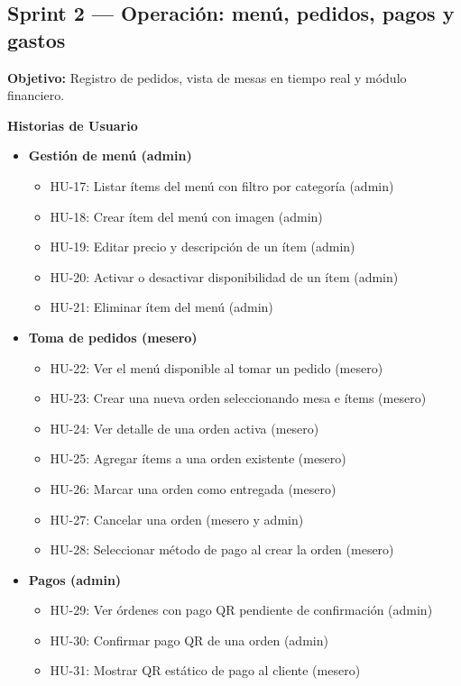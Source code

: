 \subsection*{Sprint 2 — Operación: menú, pedidos, pagos y gastos}

\textbf{Objetivo:}  
Registro de pedidos, vista de mesas en tiempo real y módulo financiero.

\textbf{Historias de Usuario}

\begin{itemize}[leftmargin=1.5em]

\item \textbf{Gestión de menú (admin)}

\begin{itemize}
\item HU-17: Listar ítems del menú con filtro por categoría (admin)
\item HU-18: Crear ítem del menú con imagen (admin)
\item HU-19: Editar precio y descripción de un ítem (admin)
\item HU-20: Activar o desactivar disponibilidad de un ítem (admin)
\item HU-21: Eliminar ítem del menú (admin)
\end{itemize}

\item \textbf{Toma de pedidos (mesero)}

\begin{itemize}
\item HU-22: Ver el menú disponible al tomar un pedido (mesero)
\item HU-23: Crear una nueva orden seleccionando mesa e ítems (mesero)
\item HU-24: Ver detalle de una orden activa (mesero)
\item HU-25: Agregar ítems a una orden existente (mesero)
\item HU-26: Marcar una orden como entregada (mesero)
\item HU-27: Cancelar una orden (mesero y admin)
\item HU-28: Seleccionar método de pago al crear la orden (mesero)
\end{itemize}

\item \textbf{Pagos (admin)}

\begin{itemize}
\item HU-29: Ver órdenes con pago QR pendiente de confirmación (admin)
\item HU-30: Confirmar pago QR de una orden (admin)
\item HU-31: Mostrar QR estático de pago al cliente (mesero)
\end{itemize}


\end{itemize}
